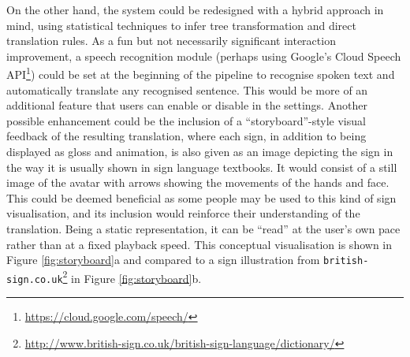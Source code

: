 \documentclass[12pt]{ociamthesis}  %
\begin{document}
On the other hand, the system could be redesigned with a hybrid approach in mind, using statistical techniques to infer tree transformation and direct translation rules. As a fun but not necessarily  significant interaction improvement, a speech recognition module (perhaps using Google's Cloud Speech API\footnote{\url{https://cloud.google.com/speech/}}) could be set at the beginning of the pipeline to recognise spoken text and automatically translate any recognised sentence. This would be more of an additional feature that users can enable or disable in the settings. Another possible enhancement could be the inclusion of a ``storyboard''-style visual feedback of the resulting translation, where each sign, in addition to being displayed as gloss and animation, is also given as an image depicting the sign in the way it is usually shown in sign language textbooks. It would consist of a still image of the avatar with arrows showing the movements of the hands and face. This could be deemed beneficial as some people may be used to this kind of sign visualisation, and its inclusion would reinforce their understanding of the translation. Being a static representation, it can be ``read'' at the user's own pace rather than at a fixed playback speed. This conceptual visualisation is shown in Figure \ref{fig:storyboard}a and compared to a sign illustration from \texttt{british-sign.co.uk}\footnote{\url{http://www.british-sign.co.uk/british-sign-language/dictionary/}} in Figure \ref{fig:storyboard}b.
\end{document}
